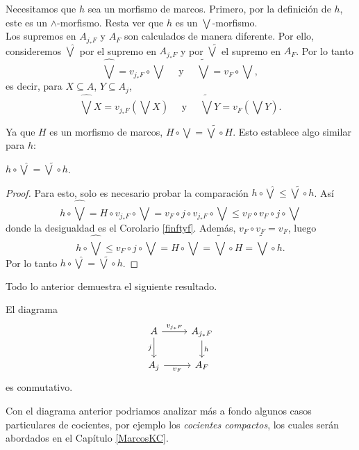 Necesitamos que $h$ sea un morfismo de marcos. Primero, por la definición de $h$, este es un $\wedge$-morfismo. Resta ver que $h$ es un $\bigvee$-morfismo.\\

Los supremos en $A_{j_*F}$ y $A_F$ son calculados de manera diferente. Por ello, consideremos $\hat{\bigvee}$ por el supremo en $A_{j_*F}$ y por $\tilde{\bigvee}$ el supremo en $A_F$. Por lo tanto
\[
\hat{\bigvee}=v_{j_*F}\circ \bigvee\quad\mbox{ y }\quad \tilde{\bigvee}=v_{F}\circ \bigvee,
\] 
es decir, para $X\subseteq A$, $Y\subseteq A_j$,
\[
	\hat{\bigvee}X=v_{j_*F}(\bigvee X)\quad\mbox{ y }\quad \tilde{\bigvee}Y=v_{F}(\bigvee Y).
\]

Ya que $H$ es un morfismo de marcos, $H\circ \bigvee=\tilde{\bigvee}\circ H$. Esto establece algo similar para $h$:

\begin{lem}\label{bigvee g}
$h\circ \hat{\bigvee}=\tilde{\bigvee}\circ h$.
\end{lem}

\begin{proof}
Para esto, solo es necesario probar la comparación $h\circ \hat{\bigvee}\leq \tilde{\bigvee}\circ h$. Así
\[
h\circ \hat{\bigvee}=H\circ v_{j_*F}\circ \bigvee=v_F\circ j\circ v_{j_*F}\circ \bigvee\leq v_F\circ v_F\circ j\circ \bigvee
\]
donde la desigualdad es el Corolario \ref{finftyf}. Además, $v_F\circ v_F=v_F$, luego
\[
h\circ\hat{\bigvee}\leq v_F\circ j\circ \bigvee =H\circ \bigvee=\tilde{\bigvee}\circ H=\tilde{\bigvee}\circ h.
\]
Por lo tanto $h\circ\hat{\bigvee}=\tilde{\bigvee}\circ h$.
\end{proof}

Todo lo anterior demuestra el siguiente resultado.

\begin{prop}\label{VFsquare}
El diagrama
\[\begin{tikzcd}
	A & {A_{j_*F}} \\
	{A_j} & {A_F}
	\arrow["{v_{j_*F}}", from=1-1, to=1-2]
	\arrow["j"', from=1-1, to=2-1]
	\arrow["h", from=1-2, to=2-2]
	\arrow["{v_F}"', from=2-1, to=2-2]
\end{tikzcd}\]
es conmutativo.
\end{prop}

Con el diagrama anterior podriamos analizar más a fondo algunos casos particulares de cocientes, por ejemplo los \emph{cocientes compactos}, los cuales serán abordados en el Capítulo \ref{MarcosKC}.